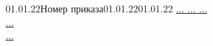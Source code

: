 \documentclass[../document.tex]{subfiles}
\begin{document}
    \begin{thesistask}{01.01.22}{Номер приказа}{01.01.22}{01.01.22}
        \taskitem
        \uline{
            ...\hfill\null
        }
        \taskitem
        \uline{
            ...\hfill\null
        }
        \taskitem
        \uline{
            ...\hfill\null\\
            ...\hfill\null\\
            ...\hfill\null\\
        }
    \end{thesistask}
\end{document}
